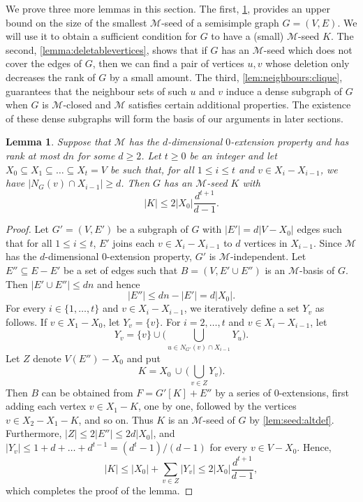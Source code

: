 \documentclass[11pt,a4paper,dvipsnames]{scrartcl}
\newtheorem{lemma}[theorem]{Lemma}
\newcommand{\cM}{{\mathcal{M}}}
\begin{document}
We prove three more lemmas in this section. The first,
\cref{lem:small_kernel}, provides an upper bound on the size of the smallest $\cM$-seed of a semisimple graph $G=(V,E)$. We will use it to obtain a sufficient condition for $G$ to have 
a (small) $\cM$-seed $K$. %
The second, \cref{lemma:deletablevertices}, shows that if $G$ has an $\cM$-seed 
which does not cover the edges of $G$,
then we can find a pair of vertices $u,v$ whose deletion only decreases the rank of $G$ by a small amount. The third, \cref{lem:neighbours:clique}, guarantees that the neighbour sets of such $u$ and $v$ induce a dense subgraph of $G$ when $G$ is $\cM$-closed and $\cM$ satisfies certain additional properties. The existence of these dense subgraphs will form the basis of our arguments in later sections.



\begin{lemma}\label{lem:small_kernel}
    Suppose that $\cM$ has
    the $d$-dimensional $0$-extension property and has
    rank at most $dn$ for some $d\geq 2$. Let $t\geq 0$ be an integer and let $X_0\subseteq X_1\subseteq\dots\subseteq X_t=V$ be such that, for all $1\leq i\leq t$ and $v\in X_i-X_{i-1}$, we have $|N_G(v)\cap X_{i-1}|\geq d$.
    Then $G$ has an $\cM$-seed $K$ with \[|K|\leq 2|X_0|\frac{d^{t+1}}{d-1}.\]
\end{lemma}
\begin{proof}
    Let $G'=(V,E')$ be a subgraph of $G$ with $|E'|=d|V-X_0|$ edges such that for all $1\leq i\leq t$, $E'$ joins each $v\in X_i-X_{i-1}$ to $d$ vertices in $X_{i-1}$.  
    Since $\cM$ has the $d$-dimensional 0-extension property, $G'$ is $\cM$-independent. Let $E''\subseteq E-E'$ be a set of edges such that $B=(V,E'\cup E'')$ is an $\cM$-basis of $G$. Then $|E'\cup E''|\leq dn $ and hence
    \begin{equation*}\label{eq:2}
        |E''|\leq dn-|E'|= d|X_0|.
    \end{equation*}
    For every $i \in \{1,\ldots,t\}$ and $v\in X_i-X_{i-1}$, we iteratively define a set $Y_v$ as follows. If $v \in X_1 - X_0$, let $Y_v=\{v\}$.
    For $i=2,\dots,t$ and $v\in X_i-X_{i-1}$, let $$Y_v=\{v\}\cup\bigg(\bigcup_{u \in  N_{G'}(v)\cap X_{i-1}}Y_u\bigg).$$ 
    Let $Z$ denote $V(E'')-X_0$ and
    put $$K=X_0\,\cup\, \bigg(\bigcup_{v\in Z}Y_v\bigg).$$  Then $B$ can be obtained from $F=G'[K]+E''$ by a series of 0-extensions, first adding each vertex $v\in X_1-K$, one by one, followed by the vertices $v\in X_2-X_1-K$, and so on. Thus $K$ is an $\cM$-seed of $G$ by \cref{lem:seed:altdef}.
    Furthermore, $|Z|\leq 2|E''|\leq 2d|X_0|$, and $|Y_v|\leq 1+d+\dots +d^{t-1}=(d^{t}-1)/(d-1) $ for every $v\in V-X_0$. 
    Hence,
\[|K|\leq |X_0|+\sum_{v\in Z}|Y_v|\leq 2|X_0|\frac{d^{t+1}}{d-1},\]
    which completes the proof of the lemma. 
\end{proof}
\end{document}
